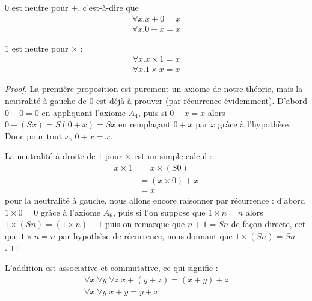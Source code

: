 \begin{prop}[Neutre]
    $0$ est neutre pour $+$, c'est-à-dire que \begin{align*}
        \forall x.x+0=x\\
        \forall x.0+x=x
    \end{align*}

    $1$ est neutre pour $\times$ :
    \begin{align*}
        \forall x. x\times 1=x\\
        \forall x. 1\times x=x
    \end{align*}
\end{prop}

\begin{proof}
    La première proposition est purement un axiome de notre théorie, mais la neutralité à gauche de $0$ est déjà à prouver (par récurrence évidemment). D'abord $0+0=0$ en appliquant l'axiome $A_4$, puis si $0+x=x$ alors $0+(S x) = S (0+x) = S x$ en remplaçant $0+x$ par $x$ grâce à l'hypothèse. Donc pour tout $x$, $0+x=x$.

    La neutralité à droite de $1$ pour $\times$ est un simple calcul :
    \begin{align*}
        x\times 1 &= x\times (S 0)\\
        &= (x\times 0) + x\\
        &= x
    \end{align*}
    pour la neutralité à gauche, nous allons encore raisonner par récurrence : d'abord $1\times 0 = 0$ grâce à l'axiome $A_6$, puis si l'on suppose que $1\times n = n$ alors $1\times (S n) = (1\times n) + 1$ puis on remarque que $n+1=S n$ de façon directe, eet que $1\times n = n$ par hypothèse de récurrence, nous donnant que $1\times (S n) = S n$.
\end{proof}

\begin{prop}
    L'addition est associative et commutative, ce qui signifie :
    \begin{align*}
        \forall x.\forall y.\forall z. x+(y+z) = (x+y)+z\\
        \forall x.\forall y. x+y = y+x
    \end{align*}
\end{prop}

